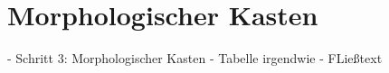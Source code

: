 \section{Morphologischer Kasten}

	- Schritt 3: Morphologischer Kasten
		- Tabelle irgendwie
		- FLießtext